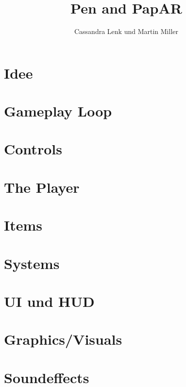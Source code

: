 \documentclass[11pt]{article}
\begin{document}
    \title{Pen and PapAR}
    \author{Cassandra Lenk und Martin Miller}

    \maketitle
    \newpage

    \tableofcontents
    \newpage

    \section{Idee}

    \section{Gameplay Loop}

    \section{Controls}

    \section{The Player}

    \section{Items}

    \section{Systems}

    \section{UI und HUD}

    \section{Graphics/Visuals}

    \section{Soundeffects}
\end{document}
